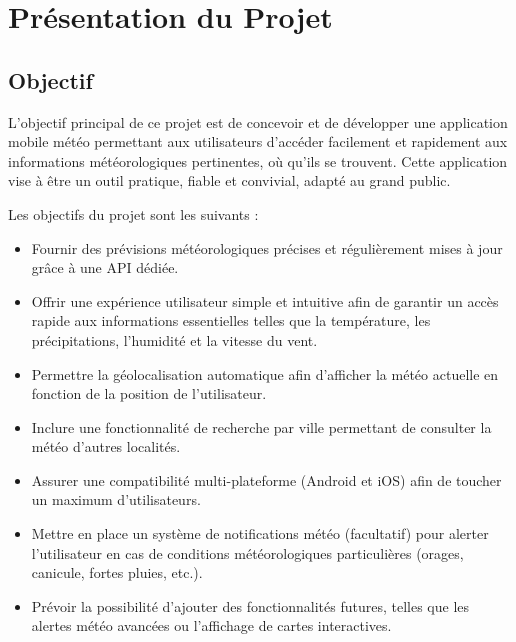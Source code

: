 \chapter{Présentation du Projet}

\section{Objectif}

L’objectif principal de ce projet est de concevoir et de développer une application mobile météo permettant aux utilisateurs d’accéder facilement et rapidement aux informations météorologiques pertinentes, où qu’ils se trouvent. Cette application vise à être un outil pratique, fiable et convivial, adapté au grand public.

\noindent Les objectifs du projet sont les suivants :

\begin{itemize}
    \item Fournir des prévisions météorologiques précises et régulièrement mises à jour grâce à une API dédiée.
    
    \item Offrir une expérience utilisateur simple et intuitive afin de garantir un accès rapide aux informations essentielles telles que la température, les précipitations, l’humidité et la vitesse du vent.
    
    \item Permettre la géolocalisation automatique afin d’afficher la météo actuelle en fonction de la position de l’utilisateur.
    
    \item Inclure une fonctionnalité de recherche par ville permettant de consulter la météo d’autres localités.
    
    \item Assurer une compatibilité multi-plateforme (Android et iOS) afin de toucher un maximum d’utilisateurs.
    
    \item Mettre en place un système de notifications météo (facultatif) pour alerter l’utilisateur en cas de conditions météorologiques particulières (orages, canicule, fortes pluies, etc.).
    
    \item Prévoir la possibilité d’ajouter des fonctionnalités futures, telles que les alertes météo avancées ou l’affichage de cartes interactives.
\end{itemize}



